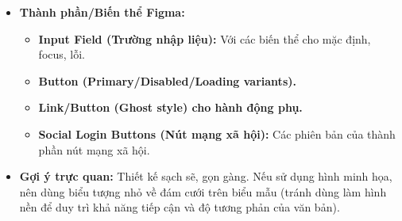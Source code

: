 \documentclass[11pt,a4paper]{article}
\begin{document}
\begin{itemize}
    \begin{itemize}
        \item Nhãn rõ ràng cho từng ô nhập liệu (``Địa chỉ Email'', ``Mật khẩu'') hoặc sử dụng aria-label.
        \item Đảm bảo có kiểu dáng viền (focus styles) khi ô nhập liệu được chọn.
        \item Ô mật khẩu cho phép hiển thị/ẩn (sử dụng biểu tượng mắt làm biến thể).
    \end{itemize}
    \item \textbf{Thành phần/Biến thể Figma:}
    \begin{itemize}
        \item \textbf{Input Field (Trường nhập liệu):} Với các biến thể cho mặc định, focus, lỗi.
        \item \textbf{Button (Primary/Disabled/Loading variants).}
        \item \textbf{Link/Button (Ghost style) cho hành động phụ.}
        \item \textbf{Social Login Buttons (Nút mạng xã hội):} Các phiên bản của thành phần nút mạng xã hội.
    \end{itemize}
    \item \textbf{Gợi ý trực quan:} Thiết kế sạch sẽ, gọn gàng. Nếu sử dụng hình minh họa, nên dùng biểu tượng nhỏ về đám cưới trên biểu mẫu (tránh dùng làm hình nền để duy trì khả năng tiếp cận và độ tương phản của văn bản).
\end{itemize}
\end{document}
